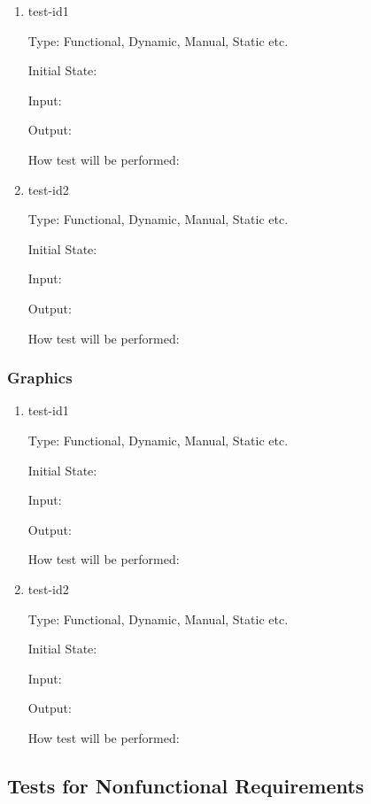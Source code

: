\documentclass[12pt, titlepage]{article}
\begin{document}
\begin{enumerate}

\item{test-id1\\}

Type: Functional, Dynamic, Manual, Static etc.
					
Initial State: 
					
Input: 
					
Output: 
					
How test will be performed: 
					
\item{test-id2\\}

Type: Functional, Dynamic, Manual, Static etc.
					
Initial State: 
					
Input: 
					
Output: 
					
How test will be performed: 

\end{enumerate}

\subsubsection{Graphics}

\begin{enumerate}

\item{test-id1\\}

Type: Functional, Dynamic, Manual, Static etc.
					
Initial State: 
					
Input: 
					
Output: 
					
How test will be performed: 
					
\item{test-id2\\}

Type: Functional, Dynamic, Manual, Static etc.
					
Initial State: 
					
Input: 
					
Output: 
					
How test will be performed: 

\end{enumerate}

\subsection{Tests for Nonfunctional Requirements}
\end{document}
